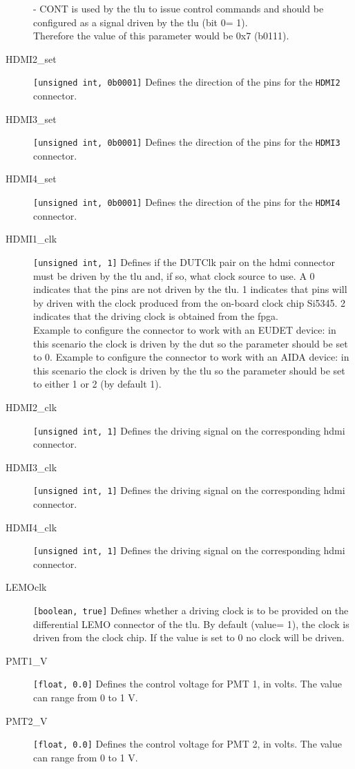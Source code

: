 \begin{description}
  - CONT is used by the \gls{tlu} to issue control commands and should be configured as a signal driven by the \gls{tlu} (bit 0= 1).\\
  Therefore the value of this parameter would be 0x7 (b0111).
  \item[HDMI2\_set] \verb|[unsigned int, 0b0001]| Defines the direction of the pins for the \verb|HDMI2| connector.
  \item[HDMI3\_set] \verb|[unsigned int, 0b0001]| Defines the direction of the pins for the \verb|HDMI3| connector.
  \item[HDMI4\_set] \verb|[unsigned int, 0b0001]| Defines the direction of the pins for the \verb|HDMI4| connector.
  \item[HDMI1\_clk] \verb|[unsigned int, 1]| Defines if the DUTClk pair on the \gls{hdmi} connector must be driven by the \gls{tlu} and, if so, what clock source to use. A 0 indicates that the pins are not driven by the \gls{tlu}. 1 indicates that pins will by driven with the clock produced from the on-board clock chip Si5345. 2 indicates that the driving clock is obtained from the \gls{fpga}.\\
      Example to configure the connector to work with an EUDET device: in this scenario the clock is driven by the \gls{dut} so the parameter should be set to 0.
      Example to configure the connector to work with an AIDA device: in this scenario the clock is driven by the \gls{tlu} so the parameter should be set to either 1 or 2 (by default 1).
  \item[HDMI2\_clk] \verb|[unsigned int, 1]| Defines the driving signal on the corresponding \gls{hdmi} connector.
  \item[HDMI3\_clk] \verb|[unsigned int, 1]| Defines the driving signal on the corresponding \gls{hdmi} connector.
  \item[HDMI4\_clk] \verb|[unsigned int, 1]| Defines the driving signal on the corresponding \gls{hdmi} connector.
  \item[LEMOclk] \verb|[boolean, true]| Defines whether a driving clock is to be provided on the differential LEMO connector of the \gls{tlu}. By default (value= 1), the clock is driven from the clock chip. If the value is set to 0 no clock will be driven.
  \item[PMT1\_V] \verb|[float, 0.0]| Defines the control voltage for PMT 1, in volts. The value can range from 0 to 1 V.
  \item[PMT2\_V] \verb|[float, 0.0]| Defines the control voltage for PMT 2, in volts. The value can range from 0 to 1 V.

\end{description}
